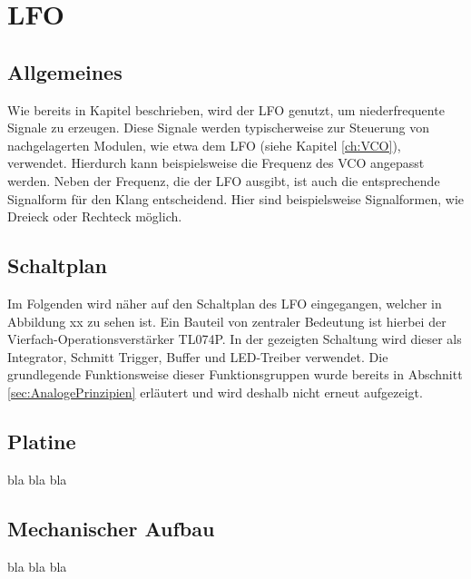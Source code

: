 \chapter{LFO}
\label{ch:concept}

\section{Allgemeines}
Wie bereits in Kapitel \label{ch:concept} beschrieben, wird der LFO genutzt, um niederfrequente Signale zu erzeugen. 
Diese Signale werden typischerweise zur Steuerung von nachgelagerten Modulen, wie etwa dem LFO (siehe Kapitel \ref{ch:VCO}), verwendet.
Hierdurch kann beispielsweise die Frequenz des VCO angepasst werden. 
Neben der Frequenz, die der LFO ausgibt, ist auch die entsprechende Signalform für den Klang entscheidend. Hier sind beispielsweise Signalformen, wie Dreieck oder Rechteck möglich.

\section{Schaltplan}
Im Folgenden wird näher auf den Schaltplan des LFO eingegangen, welcher in Abbildung xx zu sehen ist. 
Ein Bauteil von zentraler Bedeutung ist hierbei der Vierfach-Operationsverstärker TL074P. In der gezeigten Schaltung wird dieser als Integrator, Schmitt Trigger, Buffer und LED-Treiber verwendet.
Die grundlegende Funktionsweise dieser Funktionsgruppen wurde bereits in Abschnitt \ref{sec:AnalogePrinzipien} erläutert und wird deshalb nicht erneut aufgezeigt.
 

\section{Platine}
bla bla bla

\section{Mechanischer Aufbau}
bla bla bla